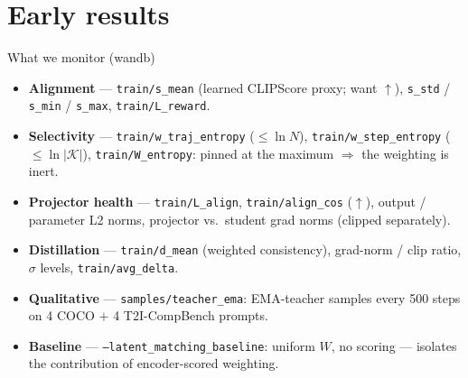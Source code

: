 \documentclass[aspectratio=169,10pt]{beamer}
\begin{document}
\section{Early results}

\begin{frame}{What we monitor (wandb)}
  \begin{itemize}
    \item \textbf{Alignment} --- \texttt{train/s\_mean} (learned CLIPScore
      proxy; want $\uparrow$), \texttt{s\_std} / \texttt{s\_min} /
      \texttt{s\_max}, \texttt{train/L\_reward}.
    \item \textbf{Selectivity} --- \texttt{train/w\_traj\_entropy}
      ($\le \ln N$), \texttt{train/w\_step\_entropy}
      ($\le \ln |\mathcal{K}|$), \texttt{train/W\_entropy}: pinned at the
      maximum $\Rightarrow$ the weighting is inert.
    \item \textbf{Projector health} --- \texttt{train/L\_align},
      \texttt{train/align\_cos} ($\uparrow$), output / parameter L2 norms,
      projector vs.\ student grad norms (clipped separately).
    \item \textbf{Distillation} --- \texttt{train/d\_mean} (weighted
      consistency), grad-norm / clip ratio, $\sigma$ levels,
      \texttt{train/avg\_delta}.
    \item \textbf{Qualitative} --- \texttt{samples/teacher\_ema}: EMA-teacher
      samples every 500 steps on 4 COCO $+$ 4 T2I-CompBench prompts.
    \item \textbf{Baseline} --- \texttt{--latent\_matching\_baseline}: uniform
      $W$, no scoring --- isolates the contribution of encoder-scored
      weighting.
  \end{itemize}
\end{frame}
\end{document}
